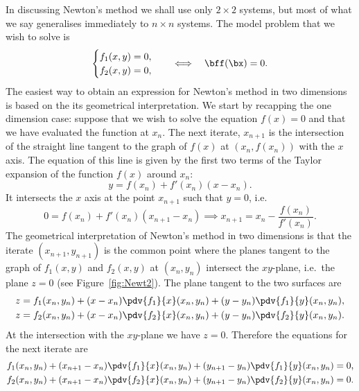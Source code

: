 In discussing Newton's method we shall use only $2 \times 2$ systems,
but most of what we say generalises immediately to $n \times n$
systems.   The model problem that we wish to solve is
%
\begin{equation*}
  \begin{cases}
    f_1(x,y) = 0, \\ f_2(x,y) = 0 ,
  \end{cases}
  \quad \Longleftrightarrow \quad
  \bff(\bx) = 0 .
\end{equation*}
%
The easiest way to obtain an expression for Newton's method in two
dimensions is based on the its geometrical interpretation.   We start
by recapping the one dimension case: suppose that we wish to solve the
equation $f(x) = 0$ and that we have evaluated the function at $x_n$.
The next iterate, $x_{n+1}$ is the intersection of the straight line
tangent to the graph of $f(x)$ at $(x_n, f(x_n))$ with the $x$ axis.
The equation of this line is given by the first two terms of the
Taylor expansion of the function $f(x)$ around $x_n$:
%
\begin{equation*}
  y = f(x_n) + f'(x_n) (x - x_n) .
\end{equation*}
%
It intersects the $x$ axis at the point $x_{n+1}$ such that $y=0$, i.e.
%
\begin{equation*}
  0 = f(x_n) + f'(x_n) (x_{n+1} - x_n) \implies
  x_{n+1} =  x_n - \frac{f(x_n)}{f'(x_n)} .
\end{equation*}
%
The geometrical interpretation of Newton's method in two dimensions is
that the iterate $(x_{n+1},y_{n+1})$ is the common point where
the planes tangent to the graph of $f_1(x,y)$ and $f_2(x,y)$ at
$(x_n,y_n)$ intersect the $xy$-plane, i.e.\ the plane $z=0$ (see
Figure~\ref{fig:Newt2}).  The plane tangent to the two surfaces are
%
\begin{align*}
  z &= f_1(x_n,y_n) + (x - x_n) \pdv{f_1}{x}(x_n,y_n) +
  (y - y_n) \pdv{f_1}{y}(x_n,y_n) , \\
  z &= f_2(x_n,y_n) + (x - x_n) \pdv{f_2}{x}(x_n,y_n) +
           (y - y_n) \pdv{f_2}{y}(x_n,y_n) .
\end{align*}
%
At the intersection with the $xy$-plane we have $z=0$.
Therefore the equations for the next iterate are
%
\begin{align}
  f_1(x_n,y_n) + (x_{n+1} - x_n) \pdv{f_1}{x}(x_n,y_n) +
  (y_{n+1} - y_n) \pdv{f_1}{y}(x_n,y_n) &= 0 ,
  \label{eq:f1} \\
  f_2(x_n,y_n) + (x_{n+1} - x_n) \pdv{f_2}{x}(x_n,y_n) +
  (y_{n+1} - y_n) \pdv{f_2}{y}(x_n,y_n) &= 0 .
  \label{eq:f2}
\end{align}
